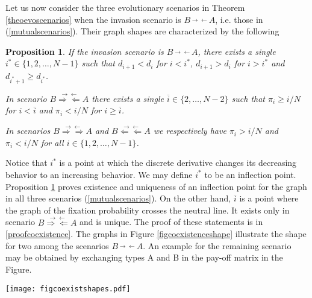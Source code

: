 \documentclass[12pt]{article}
\newtheorem{proposition}{Proposition}
\begin{document}
Let us now consider the three evolutionary scenarios in Theorem \ref{theoevoscenarios} when the invasion scenario is $B\stackrel{\rightarrow \leftarrow}{} A$, i.e. those in (\ref{mutualscenarios}). Their graph shapes are characterized by the following
\begin{proposition}  \label{coexistenceshape}
	If the invasion scenario is $B\stackrel{\rightarrow \leftarrow}{} A$, there exists a single $i^{\ast} \in \{1, 2, \dots, N-1\}$ such that $d_{i+1}< d_i$ for $i <i^{\ast}$, $d_{i+1}> d_i$ for $i >i^{\ast}$ and $d_{i^{\ast}+1} \geq d_{i^{\ast}}$.	
	
	In scenario $B\stackrel{\rightarrow \leftarrow}{\Rightarrow \Leftarrow} A$ there exists a single $\overline{i} \in \{2, \dots, N-2\}$ such that $\pi_i \geq i/N$ for $i < \overline{i}$ and $\pi_i < i/N$ for $i \geq \overline{i}$.
	
	In scenarios $B\stackrel{\rightarrow \leftarrow}{\Rightarrow \Rightarrow} A$ and $B\stackrel{\rightarrow \leftarrow}{\Leftarrow \Leftarrow} A$ we respectively have $\pi_i>i/N$ and $\pi_i<i/N$ for all $i \in \{1,2, \dots, N-1\}$.
\end{proposition}
Notice that $i^{\ast}$ is a point at which the discrete derivative changes its decreasing behavior to an increasing behavior. We may define $i^{\ast}$ to be an inflection point. Proposition \ref{coexistenceshape} proves existence and uniqueness of an inflection point for the graph in all three scenarios (\ref{mutualscenarios}). On the other hand, $\overline{i}$ is a point where the graph of the fixation probability crosses the neutral line. It exists only in scenario $B\stackrel{\rightarrow \leftarrow}{\Rightarrow \Leftarrow} A$ and is unique. The proof of these statements is in \ref{proofcoexistence}. The graphs in Figure \ref{figcoexistenceshape} illustrate the shape for two among the scenarios $B\stackrel{\rightarrow \leftarrow}{} A$. An example for the remaining scenario may be obtained by exchanging types A and B in the pay-off matrix in the Figure.

\begin{figure*}
	\texttt{[image: figcoexistshapes.pdf]}
	\caption{Plot of the fixation probability of A as a function of the initial fraction $i/N$ of A individuals in the population for two values of the population size. The neutral case graph $\pi_i=i/N$ is shown for comparison. The pay-off matrix elements are $a=2$, $b= 2.1$, $c=2.2$ and $d= 1.85$  and the selection intensity is $w=1$.
	For both values $N=50$ and $N=250$ it is easy to check that $r_1>1$ and $r_{N-1}<1$. For $N=50$ we have $\rho_A>1/N$ and $\rho_B>1/N$ and the evolutionary scenario is $B\stackrel{\rightarrow \leftarrow}{\Rightarrow \Leftarrow} A$. But for $N=250$ we have $\rho_A>1/N$ and $\rho_B<1/N$, so that the evolutionary scenario is $B\stackrel{\rightarrow \leftarrow}{\Rightarrow \Rightarrow} A$.}
	\label{figcoexistenceshape}      %
\end{figure*}
\end{document}
